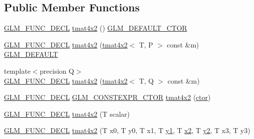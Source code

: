 \subsection*{Public Member Functions}
\begin{DoxyCompactItemize}
\item 
\mbox{\hyperlink{setup_8hpp_ab2d052de21a70539923e9bcbf6e83a51}{G\+L\+M\+\_\+\+F\+U\+N\+C\+\_\+\+D\+E\+CL}} \mbox{\hyperlink{structglm_1_1tmat4x2_a1d2457515fa1ebc93f7226f9285f0d91}{tmat4x2}} () \mbox{\hyperlink{setup_8hpp_afb97a4e995bc004c0cbbfa22125b80ba}{G\+L\+M\+\_\+\+D\+E\+F\+A\+U\+L\+T\+\_\+\+C\+T\+OR}}
\item 
\mbox{\hyperlink{setup_8hpp_ab2d052de21a70539923e9bcbf6e83a51}{G\+L\+M\+\_\+\+F\+U\+N\+C\+\_\+\+D\+E\+CL}} \mbox{\hyperlink{structglm_1_1tmat4x2_a8573e7d7acf01aa378eee49f7e9c580a}{tmat4x2}} (\mbox{\hyperlink{structglm_1_1tmat4x2}{tmat4x2}}$<$ T, P $>$ const \&m) \mbox{\hyperlink{setup_8hpp_aefce7051c376a64ba89fa93a9f63bc2c}{G\+L\+M\+\_\+\+D\+E\+F\+A\+U\+LT}}
\item 
{\footnotesize template$<$precision Q$>$ }\\\mbox{\hyperlink{setup_8hpp_ab2d052de21a70539923e9bcbf6e83a51}{G\+L\+M\+\_\+\+F\+U\+N\+C\+\_\+\+D\+E\+CL}} \mbox{\hyperlink{structglm_1_1tmat4x2_a9f5f9c3246c12a56efb4a81ccb83b844}{tmat4x2}} (\mbox{\hyperlink{structglm_1_1tmat4x2}{tmat4x2}}$<$ T, Q $>$ const \&m)
\item 
\mbox{\hyperlink{setup_8hpp_ab2d052de21a70539923e9bcbf6e83a51}{G\+L\+M\+\_\+\+F\+U\+N\+C\+\_\+\+D\+E\+CL}} \mbox{\hyperlink{setup_8hpp_ad34178a09666081abdb573c14d1f4a5a}{G\+L\+M\+\_\+\+C\+O\+N\+S\+T\+E\+X\+P\+R\+\_\+\+C\+T\+OR}} \mbox{\hyperlink{structglm_1_1tmat4x2_a167d8a564385d1fa509b3149f674769a}{tmat4x2}} (\mbox{\hyperlink{namespaceglm_a807df837905ec286f806a536af03b57f}{ctor}})
\item 
\mbox{\hyperlink{setup_8hpp_ab2d052de21a70539923e9bcbf6e83a51}{G\+L\+M\+\_\+\+F\+U\+N\+C\+\_\+\+D\+E\+CL}} \mbox{\hyperlink{structglm_1_1tmat4x2_a1dceed004da8ca2a8badf694c6f61ced}{tmat4x2}} (T scalar)
\item 
\mbox{\hyperlink{setup_8hpp_ab2d052de21a70539923e9bcbf6e83a51}{G\+L\+M\+\_\+\+F\+U\+N\+C\+\_\+\+D\+E\+CL}} \mbox{\hyperlink{structglm_1_1tmat4x2_a90b004f79bac6c199310a204ff4b88f0}{tmat4x2}} (T x0, T y0, T x1, T \mbox{\hyperlink{glad_8h_a48340161068d267815ac3131e9d03def}{y1}}, T \mbox{\hyperlink{glad_8h_ad2cea6eadb01f017f0d57e7edf0ce988}{x2}}, T \mbox{\hyperlink{glad_8h_af7158b5d27f7a6aa4ab9973fcc3a5c20}{y2}}, T x3, T y3)
\item 

\end{DoxyCompactItemize}
